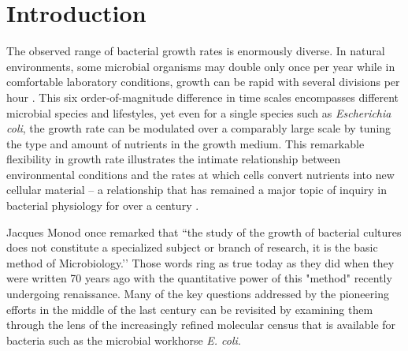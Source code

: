 \section{Introduction}
The observed range of bacterial growth rates is enormously diverse. In
natural environments, some microbial organisms may double only once per
year \citep{mikucki2009} while in comfortable laboratory conditions, growth
can be rapid with several divisions per hour \citep{schaechter1958}. This six
order-of-magnitude difference in time scales encompasses different microbial
species and lifestyles, yet even for a single species such as \textit{Escherichia
coli}, the growth rate can be modulated over a comparably large scale by tuning the
type and amount of nutrients in the growth medium. This remarkable
flexibility in growth rate illustrates the intimate relationship between
environmental conditions and the rates at which cells convert nutrients into
new cellular material -- a relationship that has remained a major topic of
inquiry in bacterial physiology for over a century \citep{jun2018}.

Jacques Monod once remarked that ``the study of the growth of bacterial
cultures does not constitute a specialized subject or branch of research, it
is the basic method of Microbiology.’’ Those words ring as true today as they
did when they were written 70 years ago \citep{monod1949} with the
quantitative power of this "method" recently undergoing renaissance. Many of
the key questions addressed by the pioneering efforts in the middle of the
last century can be revisited by examining them through the lens of the
increasingly refined molecular census that is available for bacteria such as
the microbial workhorse \textit{E. coli}.


